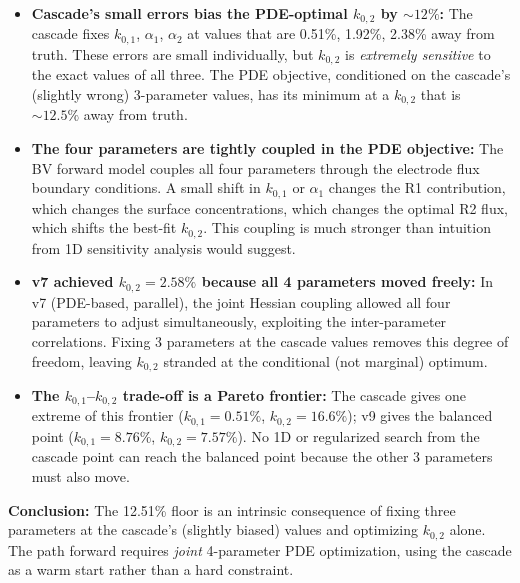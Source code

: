 \documentclass[11pt]{article}
\begin{document}
\begin{itemize}
  \item \textbf{Cascade's small errors bias the PDE-optimal $k_{0,2}$
        by ${\sim}12\%$:} The cascade fixes $k_{0,1}$, $\alpha_1$, $\alpha_2$
        at values that are 0.51\%, 1.92\%, 2.38\% away from truth.  These
        errors are small individually, but $k_{0,2}$ is \emph{extremely
        sensitive} to the exact values of all three.  The PDE objective,
        conditioned on the cascade's (slightly wrong) 3-parameter values,
        has its minimum at a $k_{0,2}$ that is ${\sim}12.5\%$ away from truth.

  \item \textbf{The four parameters are tightly coupled in the PDE objective:}
        The BV forward model couples all four parameters through the
        electrode flux boundary conditions.  A small shift in $k_{0,1}$ or
        $\alpha_1$ changes the R1 contribution, which changes the surface
        concentrations, which changes the optimal R2 flux, which shifts the
        best-fit $k_{0,2}$.  This coupling is much stronger than intuition
        from 1D sensitivity analysis would suggest.

  \item \textbf{v7 achieved $k_{0,2} = 2.58\%$ because all 4 parameters
        moved freely:} In v7 (PDE-based, parallel), the joint Hessian coupling
        allowed all four parameters to adjust simultaneously, exploiting the
        inter-parameter correlations.  Fixing 3 parameters at the cascade values
        removes this degree of freedom, leaving $k_{0,2}$ stranded at the
        conditional (not marginal) optimum.

  \item \textbf{The $k_{0,1}$--$k_{0,2}$ trade-off is a Pareto frontier:}
        The cascade gives one extreme of this frontier ($k_{0,1} = 0.51\%$,
        $k_{0,2} = 16.6\%$); v9 gives the balanced point ($k_{0,1} = 8.76\%$,
        $k_{0,2} = 7.57\%$).  No 1D or regularized search from the cascade
        point can reach the balanced point because the other 3 parameters
        must also move.
\end{itemize}

\textbf{Conclusion:} The 12.51\% floor is an intrinsic consequence of fixing
three parameters at the cascade's (slightly biased) values and optimizing
$k_{0,2}$ alone.  The path forward requires \emph{joint} 4-parameter PDE
optimization, using the cascade as a warm start rather than a hard constraint.
\end{document}
